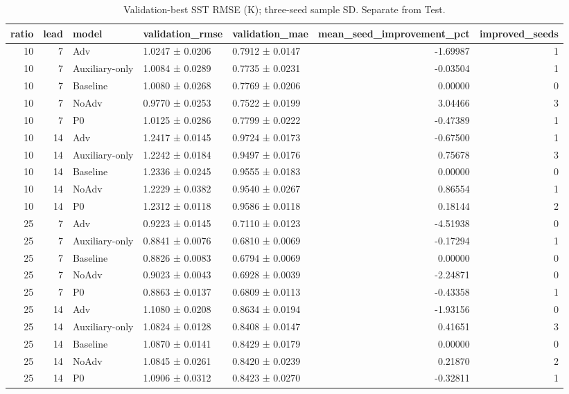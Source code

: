 \begin{table}
\caption{Validation-best SST RMSE (K); three-seed sample SD. Separate from Test.}
\label{tab:table_validation}
\begin{tabular}{rrlllrr}
\toprule
ratio & lead & model & validation\_rmse & validation\_mae & mean\_seed\_improvement\_pct & improved\_seeds \\
\midrule
10 & 7 & Adv & 1.0247 ± 0.0206 & 0.7912 ± 0.0147 & -1.69987 & 1 \\
10 & 7 & Auxiliary-only & 1.0084 ± 0.0289 & 0.7735 ± 0.0231 & -0.03504 & 1 \\
10 & 7 & Baseline & 1.0080 ± 0.0268 & 0.7769 ± 0.0206 & 0.00000 & 0 \\
10 & 7 & NoAdv & 0.9770 ± 0.0253 & 0.7522 ± 0.0199 & 3.04466 & 3 \\
10 & 7 & P0 & 1.0125 ± 0.0286 & 0.7799 ± 0.0222 & -0.47389 & 1 \\
10 & 14 & Adv & 1.2417 ± 0.0145 & 0.9724 ± 0.0173 & -0.67500 & 1 \\
10 & 14 & Auxiliary-only & 1.2242 ± 0.0184 & 0.9497 ± 0.0176 & 0.75678 & 3 \\
10 & 14 & Baseline & 1.2336 ± 0.0245 & 0.9555 ± 0.0183 & 0.00000 & 0 \\
10 & 14 & NoAdv & 1.2229 ± 0.0382 & 0.9540 ± 0.0267 & 0.86554 & 1 \\
10 & 14 & P0 & 1.2312 ± 0.0118 & 0.9586 ± 0.0118 & 0.18144 & 2 \\
25 & 7 & Adv & 0.9223 ± 0.0145 & 0.7110 ± 0.0123 & -4.51938 & 0 \\
25 & 7 & Auxiliary-only & 0.8841 ± 0.0076 & 0.6810 ± 0.0069 & -0.17294 & 1 \\
25 & 7 & Baseline & 0.8826 ± 0.0083 & 0.6794 ± 0.0069 & 0.00000 & 0 \\
25 & 7 & NoAdv & 0.9023 ± 0.0043 & 0.6928 ± 0.0039 & -2.24871 & 0 \\
25 & 7 & P0 & 0.8863 ± 0.0137 & 0.6809 ± 0.0113 & -0.43358 & 1 \\
25 & 14 & Adv & 1.1080 ± 0.0208 & 0.8634 ± 0.0194 & -1.93156 & 0 \\
25 & 14 & Auxiliary-only & 1.0824 ± 0.0128 & 0.8408 ± 0.0147 & 0.41651 & 3 \\
25 & 14 & Baseline & 1.0870 ± 0.0141 & 0.8429 ± 0.0179 & 0.00000 & 0 \\
25 & 14 & NoAdv & 1.0845 ± 0.0261 & 0.8420 ± 0.0239 & 0.21870 & 2 \\
25 & 14 & P0 & 1.0906 ± 0.0312 & 0.8423 ± 0.0270 & -0.32811 & 1 \\

\end{tabular}
\end{table}
